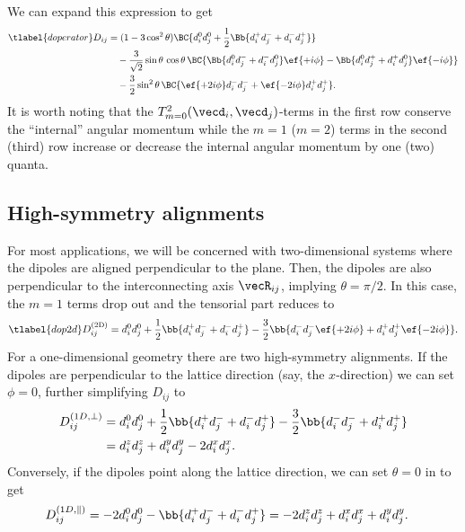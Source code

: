 We can expand this expression to get
\begin{align}\tlabel{doperator}
    D_{ij} &= (1-3\cos^2 \theta) \BC{ d_i^0 d_j^0 + \frac{1}{2}\Bb{d_i^+ d_j^- + d_i^- d_j^+} } \\
           &\quad -\frac{3}{\sqrt{2}}\sin\theta \,\cos\theta\, \BC{ \Bb{ d_i^0 d_j^- + d_i^- d_j^0 } \ef{+i\phi} - \Bb{ d_i^0 d_j^+ + d_i^+ d_j^0 } \ef{-i\phi} } \\
           &\quad -\frac{3}{2}\sin^2\theta \, \BC{ \ef{+2i\phi} d_i^- d_j^- + \ef{-2i\phi} d_i^+ d_j^+ }.
\end{align}
It is worth noting that the $T^2_{m=0}(\vecd_i, \vecd_j)$-terms in the first row conserve the ``internal'' angular momentum while the $m=1$ ($m=2$) terms in the second (third) row increase or decrease the internal angular momentum by one (two) quanta.

\subsection{High-symmetry alignments}
For most applications, we will be concerned with two-dimensional systems where the dipoles are aligned perpendicular to the plane. Then, the dipoles are also perpendicular to the interconnecting axis $\vecR_{ij}$, implying $\theta = \pi/2$. In this case, the $m=1$ terms drop out and the tensorial part reduces to
\begin{align} \tlabel{dop2d}
    D^\text{(2D)}_{ij} = d_i^0 d_j^0 + \frac{1}{2}\bb{d_i^+ d_j^- + d_i^- d_j^+} -\frac{3}{2} \bb{ d_i^- d_j^- \ef{+2i\phi} + d_i^+ d_j^+ \ef{-2i\phi} }.
\end{align}
For a one-dimensional geometry there are two high-symmetry alignments. If the dipoles are perpendicular to the lattice direction (say, the $x$-direction) we can set $\phi=0$, further simplifying $D_{ij}$ to
\begin{align}
    D_{ij}^{(1D,\perp)} &= d_i^0 d_j^0 + \frac{1}{2}\bb{d_i^+ d_j^- + d_i^- d_j^+} -\frac{3}{2} \bb{d_i^- d_j^- + d_i^+ d_j^+} \\
 &= d_i^z d_j^z + d_i^y d_j^y - 2 d_i^x d_j^x.
\end{align}
Conversely, if the dipoles point along the lattice direction, we can set $\theta=0$ in  to get
\begin{align}
    D^{(1D,\parallel)}_{ij} &= -2 d_i^0 d_j^0 - \bb{d_i^+ d_j^- + d_i^- d_j^+} = -2 d_i^z d_j^z+ d_i^x d_j^x + d_i^y d_j^y.
\end{align}

